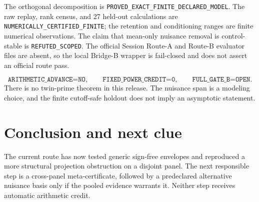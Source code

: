 \documentclass[10pt]{article}
\begin{document}
The orthogonal decomposition is
\texttt{PROVED\_EXACT\_FINITE\_DECLARED\_MODEL}.  The raw replay, rank census,
and 27 held-out calculations are \texttt{NUMERICALLY\_CERTIFIED\_FINITE}; the
retention and conditioning ranges are finite numerical observations.  The
claim that mean-only nuisance removal is control-stable is
\texttt{REFUTED\_SCOPED}.  The official Session Route-A and Route-B evaluator
files are absent, so the local Bridge-B wrapper is fail-closed and does not
assert an official route pass.

\[
 \texttt{ARITHMETIC\_ADVANCE=NO},\qquad
 \texttt{FIXED\_POWER\_CREDIT=0},\qquad
 \texttt{FULL\_GATE\_B=OPEN}.
\]
There is no twin-prime theorem in this release.  The nuisance span is a
modeling choice, and the finite cutoff-safe holdout does not imply an
asymptotic statement.

\section{Conclusion and next clue}

The current route has now tested generic sign-free envelopes and reproduced a
more structural projection obstruction on a disjoint panel.  The next
responsible step is a cross-panel meta-certificate, followed by a predeclared
alternative nuisance basis only if the pooled evidence warrants it.  Neither
step receives automatic arithmetic credit.
\end{document}
